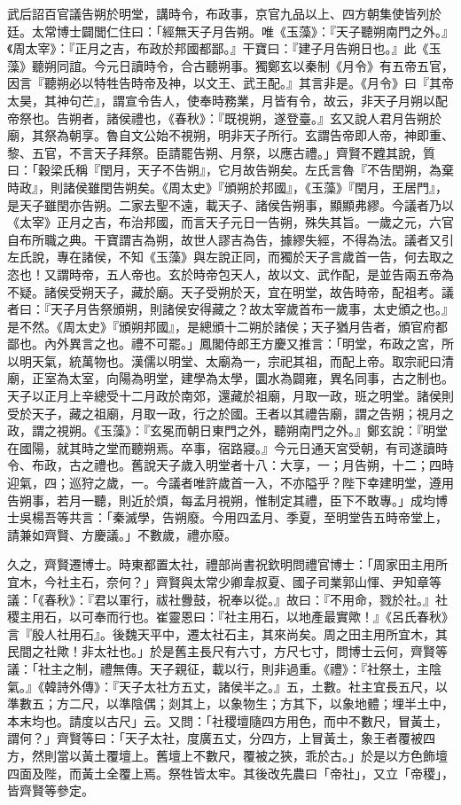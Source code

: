 \begin{pinyinscope}
 武后詔百官議告朔於明堂，講時令，布政事，京官九品以上、四方朝集使皆列於廷。太常博士闢閭仁住曰：「經無天子月告朔。唯《玉藻》：『天子聽朔南門之外。』《周太宰》：『正月之吉，布政於邦國都鄙。』干寶曰：『建子月告朔日也。』此《玉藻》聽朔同誼。今元日讀時令，合古聽朔事。獨鄭玄以秦制《月令》有五帝五官，因言『聽朔必以特牲告時帝及神，以文王、武王配。』其言非是。《月令》曰『其帝太昊，其神句芒』，謂宣令告人，使奉時務業，月皆有令，故云，非天子月朔以配帝祭也。告朔者，諸侯禮也，《春秋》：『既視朔，遂登臺。』玄又說人君月告朔於廟，其祭為朝享。魯自文公始不視朔，明非天子所行。玄謂告帝即人帝，神即重、黎、五官，不言天子拜祭。臣請罷告朔、月祭，以應古禮。」齊賢不韙其說，質曰：「穀梁氏稱『閏月，天子不告朔』，它月故告朔矣。左氏言魯『不告閏朔，為棄時政』，則諸侯雖閏告朔矣。《周太史》『頒朔於邦國』，《玉藻》『閏月，王居門』，是天子雖閏亦告朔。二家去聖不遠，載天子、諸侯告朔事，顯顯弗繆。今議者乃以《太宰》正月之吉，布治邦國，而言天子元日一告朔，殊失其旨。一歲之元，六官自布所職之典。干寶謂吉為朔，故世人謬吉為告，據繆失經，不得為法。議者又引左氏說，專在諸侯，不知《玉藻》與左說正同，而獨於天子言歲首一告，何去取之恣也！又謂時帝，五人帝也。玄於時帝包天人，故以文、武作配，是並告兩五帝為不疑。諸侯受朔天子，藏於廟。天子受朔於天，宜在明堂，故告時帝，配祖考。議者曰：『天子月告祭頒朔，則諸侯安得藏之？故太宰歲首布一歲事，太史頒之也。』是不然。《周太史》『頒朔邦國』，是總頒十二朔於諸侯；天子猶月告者，頒官府都鄙也。內外異言之也。禮不可罷。」鳳閣侍郎王方慶又推言：「明堂，布政之宮，所以明天氣，統萬物也。漢儒以明堂、太廟為一，宗祀其祖，而配上帝。取宗祀曰清廟，正室為太室，向陽為明堂，建學為太學，圜水為闢雍，異名同事，古之制也。天子以正月上辛總受十二月政於南郊，還藏於祖廟，月取一政，班之明堂。諸侯則受於天子，藏之祖廟，月取一政，行之於國。王者以其禮告廟，謂之告朔；視月之政，謂之視朔。《玉藻》：『玄冕而朝日東門之外，聽朔南門之外。』鄭玄說：『明堂在國陽，就其時之堂而聽朔焉。卒事，宿路寢。』今元日通天宮受朝，有司遂讀時令、布政，古之禮也。舊說天子歲入明堂者十八：大享，一；月告朔，十二；四時迎氣，四；巡狩之歲，一。今議者唯許歲首一入，不亦隘乎？陛下幸建明堂，遵用告朔事，若月一聽，則近於煩，每孟月視朔，惟制定其禮，臣下不敢專。」成均博士吳楊吾等共言：「秦滅學，告朔廢。今用四孟月、季夏，至明堂告五時帝堂上，請兼如齊賢、方慶議。」不數歲，禮亦廢。



 久之，齊賢遷博士。時東都置太社，禮部尚書祝欽明問禮官博士：「周家田主用所宜木，今社主石，奈何？」齊賢與太常少卿韋叔夏、國子司業郭山惲、尹知章等議：「《春秋》：『君以軍行，祓社釁鼓，祝奉以從。』故曰：『不用命，戮於社。』社稷主用石，以可奉而行也。崔靈恩曰：『社主用石，以地產最實歟！』《呂氏春秋》言『殷人社用石』。後魏天平中，遷太社石主，其來尚矣。周之田主用所宜木，其民間之社歟！非太社也。」於是舊主長尺有六寸，方尺七寸，問博士云何，齊賢等議：「社主之制，禮無傳。天子親征，載以行，則非過重。《禮》：『社祭土，主陰氣。』《韓詩外傳》：『天子太社方五丈，諸侯半之。』五，土數。社主宜長五尺，以準數五；方二尺，以準陰偶；剡其上，以象物生；方其下，以象地體；埋半土中，本末均也。請度以古尺」云。又問：「社稷壇隨四方用色，而中不數尺，冒黃土，謂何？」齊賢等曰：「天子太社，度廣五丈，分四方，上冒黃土，象王者覆被四方，然則當以黃土覆壇上。舊壇上不數尺，覆被之狹，乖於古。」於是以方色飾壇四面及陛，而黃土全覆上焉。祭牲皆太牢。其後改先農曰「帝社」，又立「帝稷」，皆齊賢等參定。




\end{pinyinscope}
